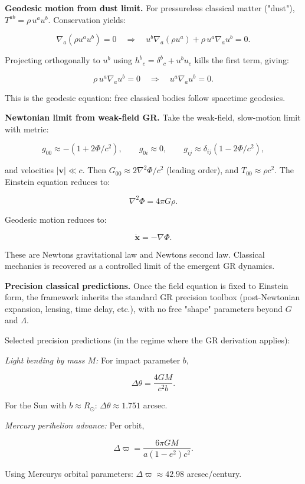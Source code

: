 \textbf{Geodesic motion from dust limit.} For pressureless classical matter ("dust"), \(T^{ab} = \rho \, u^a u^b\). Conservation yields:

\[
\nabla_a(\rho u^a u^b) = 0
\quad \Rightarrow \quad
u^b \nabla_a(\rho u^a) + \rho \, u^a \nabla_a u^b = 0.
\]

Projecting orthogonally to \(u^b\) using \(h^b{}_c = \delta^b{}_c + u^b u_c\) kills the first term, giving:

\[
\rho \, u^a \nabla_a u^b = 0
\quad \Rightarrow \quad
u^a \nabla_a u^b = 0.
\]

This is the geodesic equation: free classical bodies follow spacetime geodesics.

\textbf{Newtonian limit from weak-field GR.} Take the weak-field, slow-motion limit with metric:

\[
g_{00} \approx -(1 + 2\Phi/c^2), \qquad
g_{0i} \approx 0, \qquad
g_{ij} \approx \delta_{ij}(1 - 2\Phi/c^2),
\]

and velocities \(|\mathbf{v}| \ll c\). Then \(G_{00} \approx 2\nabla^2\Phi/c^2\) (leading order), and \(T_{00} \approx \rho c^2\). The Einstein equation reduces to:

\[
\nabla^2 \Phi = 4\pi G \rho.
\]

Geodesic motion reduces to:

\[
\ddot{\mathbf{x}} = -\nabla \Phi.
\]

These are Newton\textquotesingle s gravitational law and Newton\textquotesingle s second law. Classical mechanics is recovered as a controlled limit of the emergent GR dynamics.

\textbf{Precision classical predictions.} Once the field equation is fixed to Einstein form, the framework inherits the standard GR precision toolbox (post-Newtonian expansion, lensing, time delay, etc.), with no free "shape" parameters beyond \(G\) and \(\Lambda\).

Selected precision predictions (in the regime where the GR derivation applies):

\emph{Light bending by mass \(M\):} For impact parameter \(b\),

\[
\Delta\theta = \frac{4GM}{c^2 b}.
\]

For the Sun with \(b \approx R_\odot\): \(\Delta\theta \approx 1.751\) arcsec.

\emph{Mercury perihelion advance:} Per orbit,

\[
\Delta\varpi = \frac{6\pi GM}{a(1-e^2)c^2}.
\]

Using Mercury\textquotesingle s orbital parameters: \(\Delta\varpi \approx 42.98\) arcsec/century.


